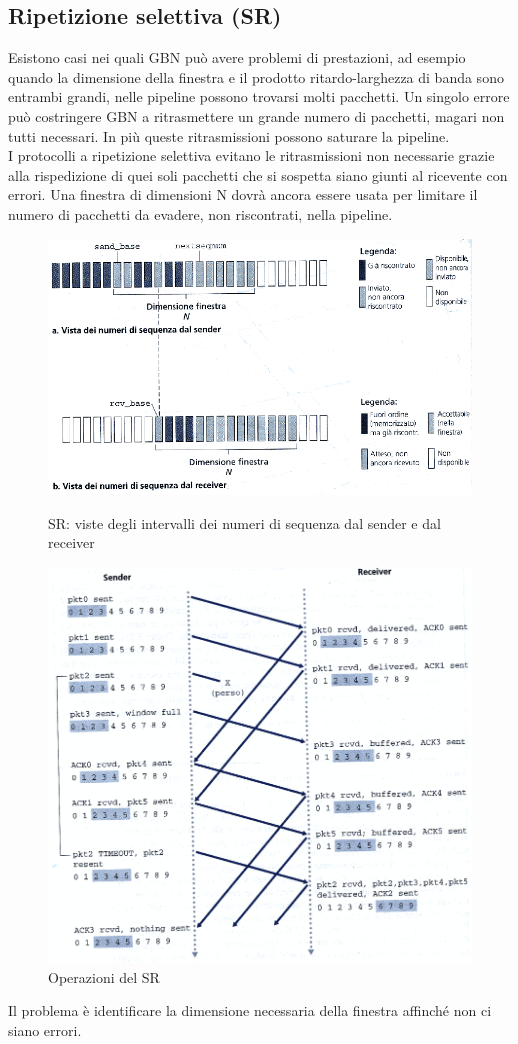 \documentclass[11pt,a4paper]{book}
\begin{document}
\subsection{Ripetizione selettiva (SR)}
Esistono casi nei quali GBN può avere problemi di prestazioni, ad esempio quando la dimensione della finestra e il prodotto ritardo-larghezza di banda sono entrambi grandi, nelle pipeline possono trovarsi molti pacchetti. Un singolo errore può costringere GBN a ritrasmettere un grande numero di pacchetti, magari non tutti necessari. In più queste ritrasmissioni possono saturare la pipeline. \\
I protocolli a ripetizione selettiva evitano le ritrasmissioni non necessarie grazie alla rispedizione di quei soli pacchetti che si sospetta siano giunti al ricevente con errori. Una finestra di dimensioni N dovrà ancora essere usata per limitare il numero di pacchetti da evadere, non riscontrati, nella pipeline.
\begin{figure}
	\includegraphics[scale=0.6]{img/028.png}
	\caption{SR: viste degli intervalli dei numeri di sequenza dal sender e dal receiver}
	\includegraphics[scale=0.6]{img/029.png}
	\caption{Operazioni del SR}
\end{figure}
Il problema è identificare la dimensione necessaria della finestra affinché non ci siano errori.
\pagebreak
\end{document}
